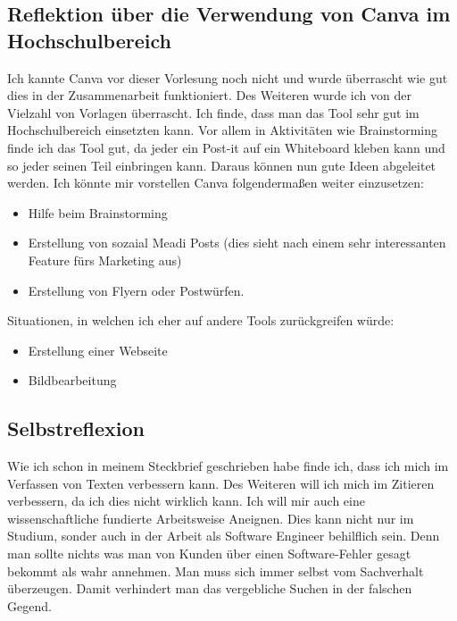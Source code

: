 \documentclass[12pt]{article}
\begin{document}
\subsection{Reflektion über die Verwendung von Canva im Hochschulbereich}
Ich kannte Canva vor dieser Vorlesung noch nicht und wurde überrascht wie gut dies in der Zusammenarbeit funktioniert. Des Weiteren wurde ich von der Vielzahl von Vorlagen überrascht. Ich finde, dass man das Tool sehr gut im Hochschulbereich einsetzten kann. Vor allem in Aktivitäten wie Brainstorming finde ich das Tool gut, da jeder ein Post-it auf ein Whiteboard kleben kann und so jeder seinen Teil einbringen kann. Daraus können nun gute Ideen abgeleitet werden. Ich könnte mir vorstellen Canva folgendermaßen weiter einzusetzen:
\begin{itemize}
 \item Hilfe beim Brainstorming
 \item Erstellung von sozaial Meadi Posts (dies sieht nach einem sehr interessanten Feature fürs Marketing aus)
 \item Erstellung von Flyern oder Postwürfen.
\end{itemize}
Situationen, in welchen ich eher auf andere Tools zurückgreifen würde:
\begin{itemize}
 \item Erstellung einer Webseite
 \item Bildbearbeitung
\end{itemize}
\subsection{Selbstreflexion}
Wie ich schon in meinem Steckbrief geschrieben habe finde ich, dass ich mich im Verfassen von Texten verbessern kann. Des Weiteren will ich mich im Zitieren verbessern, da ich dies nicht wirklich kann. Ich will mir auch eine wissenschaftliche fundierte Arbeitsweise Aneignen. Dies kann nicht nur im Studium, sonder auch in der Arbeit als Software Engineer behilflich sein. Denn man sollte nichts was man von Kunden über einen Software-Fehler gesagt bekommt als wahr annehmen. Man muss sich immer selbst vom Sachverhalt überzeugen. Damit verhindert man das vergebliche Suchen in der falschen Gegend.
\listoffigures
\lstlistoflistings
\end{document}
